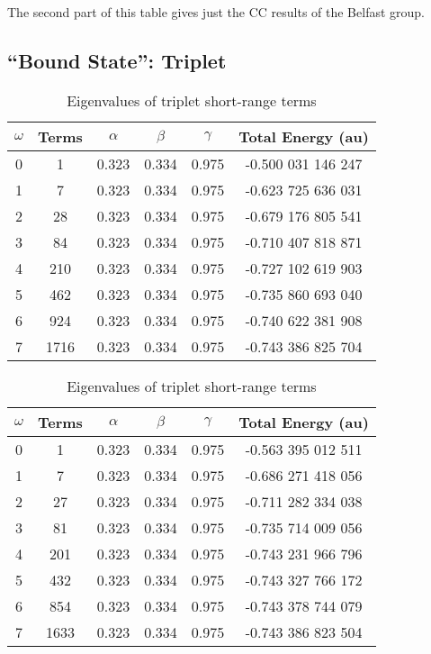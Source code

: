 \documentclass[Dissertation.tex]{subfiles}
\begin{document}
The second part of this table gives just the CC results of the Belfast group.

\subsection{``Bound State'': Triplet}

\setlength{\abovecaptionskip}{6pt}   %
\setlength{\belowcaptionskip}{6pt}   %
\begin{table}[H]
\centering
\begin{tabular}{c c c c c c}
\toprule
$\omega$ & Terms & $\alpha$ & $\beta$ & $\gamma$ & Total Energy (au) \\ [0.5ex]
\midrule
0 & 1 & 0.323 & 0.334 & 0.975 & -0.500 031 146 247 \\
1 & 7 & 0.323 & 0.334 & 0.975 & -0.623 725 636 031 \\
2 & 28 & 0.323 & 0.334 & 0.975 & -0.679 176 805 541 \\
3 & 84 & 0.323 & 0.334 & 0.975 & -0.710 407 818 871 \\
4 & 210 & 0.323 & 0.334 & 0.975 & -0.727 102 619 903 \\
5 & 462 & 0.323 & 0.334 & 0.975 & -0.735 860 693 040 \\
6 & 924 & 0.323 & 0.334 & 0.975 & -0.740 622 381 908 \\
7 & 1716 & 0.323 & 0.334 & 0.975 & -0.743 386 825 704 \\
\bottomrule
\end{tabular}
\caption{Eigenvalues of triplet short-range terms} %
\label{tab:BoundEnergy3}
\end{table}


\setlength{\abovecaptionskip}{6pt}   %
\setlength{\belowcaptionskip}{6pt}   %
\begin{table}[H]
\centering
\begin{tabular}{c c c c c c}
\toprule
$\omega$ & Terms & $\alpha$ & $\beta$ & $\gamma$ & Total Energy (au) \\ [0.5ex]
\midrule
0 & 1 & 0.323 & 0.334 & 0.975 & -0.563 395 012 511 \\
1 & 7 & 0.323 & 0.334 & 0.975 & -0.686 271 418 056 \\
2 & 27 & 0.323 & 0.334 & 0.975 & -0.711 282 334 038 \\
3 & 81 & 0.323 & 0.334 & 0.975 & -0.735 714 009 056 \\
4 & 201 & 0.323 & 0.334 & 0.975 & -0.743 231 966 796 \\
5 & 432 & 0.323 & 0.334 & 0.975 & -0.743 327 766 172 \\
6 & 854 & 0.323 & 0.334 & 0.975 & -0.743 378 744 079 \\
7 & 1633 & 0.323 & 0.334 & 0.975 & -0.743 386 823 504 \\
\bottomrule
\end{tabular}
\caption{Eigenvalues of triplet short-range terms} %
\label{tab:BoundEnergyTodd3}
\end{table}
\end{document}
